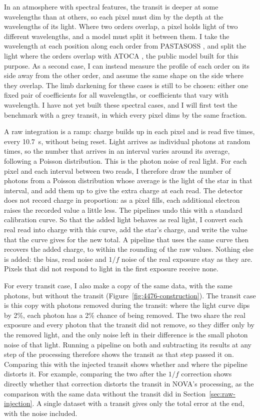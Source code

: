 In an atmosphere with spectral features, the transit is deeper at some
wavelengths than at others, so each pixel must dim by the depth at the
wavelengths of its light. Where two orders overlap, a pixel holds light of two
different wavelengths, and a model must split it between them. I take the
wavelength at each position along each order from PASTASOSS
\citep{BainesEtAl2023Wavelength}, and split the light where the orders overlap
with ATOCA \citep{DarveauBernierEtAl2022}, the public model built for this
purpose. As a second case, I can instead measure the profile of each order on
its side away from the other order, and assume the same shape on the side
where they overlap. The limb darkening for these cases is still to be chosen:
either one fixed pair of coefficients for all wavelengths, or coefficients that vary with wavelength. I have not yet built these spectral cases, and I will first test the benchmark with a grey transit, in which every pixel dims by the same fraction.

A raw integration is a ramp: charge builds up in each pixel and is read five
times, every 10.7~s, without being reset. Light arrives as individual photons
at random times, so the number that arrives in an interval varies around its
average, following a Poisson distribution. This is the photon noise of real
light. For each pixel and each interval between two reads, I therefore draw
the number of photons from a Poisson distribution whose average is the light
of the star in that interval, and add them up to give the extra charge at each
read. The detector does not record charge in proportion: as a pixel fills,
each additional electron raises the recorded value a little less. The
pipelines undo this with a standard calibration curve. So that the added light
behaves as real light, I convert each real read into charge with this curve,
add the star's charge, and write the value that the curve gives for the new
total. A pipeline that uses the same curve then recovers the added charge, to
within the rounding of the raw values. Nothing else is added: the bias, read
noise and $1/f$ noise of the real exposure stay as they are. Pixels that did
not respond to light in the first exposure receive none.

For every transit case, I also make a copy of the same data, with the same
photons, but without the transit (Figure~\ref{fig:4476-construction}). The
transit case is this copy with photons removed during the transit: where the
light curve dips by 2\%, each photon has a 2\% chance of being removed. The two share the real exposure and every photon that the transit did not remove, so they differ only by the removed light, and the only noise left in their difference is the small photon noise of that light. Running a pipeline on both and subtracting its results at any step of the processing therefore shows the transit as that step passed it on. Comparing this with the injected transit shows whether and where the
pipeline distorts it. For example, comparing the two after the $1/f$
correction shows directly whether that correction distorts the transit in
NOVA's processing, as the comparison with the same data without the transit
did in Section~\ref{sec:raw-injection}. A single dataset with a transit gives
only the total error at the end, with the noise included.

